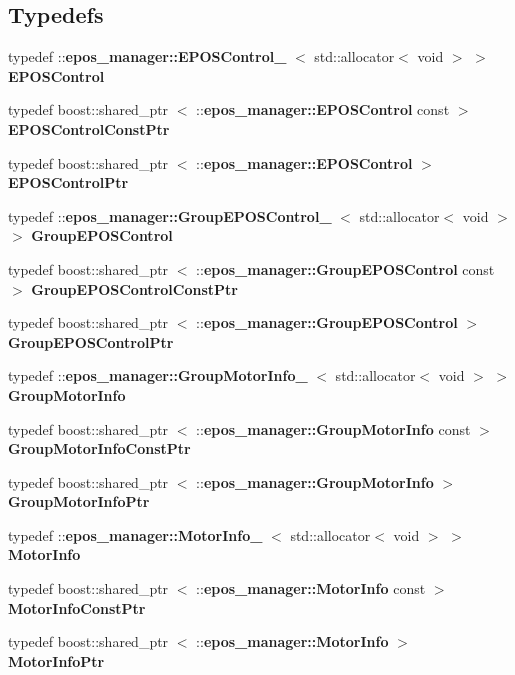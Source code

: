 \subsection*{\-Typedefs}
\begin{DoxyCompactItemize}
\item 
typedef \*
\-::{\bf epos\-\_\-manager\-::\-E\-P\-O\-S\-Control\-\_\-}\*
$<$ std\-::allocator$<$ void $>$ $>$ {\bf \-E\-P\-O\-S\-Control}
\item 
typedef boost\-::shared\-\_\-ptr\*
$<$ \-::{\bf epos\-\_\-manager\-::\-E\-P\-O\-S\-Control} \*
const  $>$ {\bf \-E\-P\-O\-S\-Control\-Const\-Ptr}
\item 
typedef boost\-::shared\-\_\-ptr\*
$<$ \-::{\bf epos\-\_\-manager\-::\-E\-P\-O\-S\-Control} $>$ {\bf \-E\-P\-O\-S\-Control\-Ptr}
\item 
typedef \*
\-::{\bf epos\-\_\-manager\-::\-Group\-E\-P\-O\-S\-Control\-\_\-}\*
$<$ std\-::allocator$<$ void $>$ $>$ {\bf \-Group\-E\-P\-O\-S\-Control}
\item 
typedef boost\-::shared\-\_\-ptr\*
$<$ \-::{\bf epos\-\_\-manager\-::\-Group\-E\-P\-O\-S\-Control} \*
const  $>$ {\bf \-Group\-E\-P\-O\-S\-Control\-Const\-Ptr}
\item 
typedef boost\-::shared\-\_\-ptr\*
$<$ \-::{\bf epos\-\_\-manager\-::\-Group\-E\-P\-O\-S\-Control} $>$ {\bf \-Group\-E\-P\-O\-S\-Control\-Ptr}
\item 
typedef \*
\-::{\bf epos\-\_\-manager\-::\-Group\-Motor\-Info\-\_\-}\*
$<$ std\-::allocator$<$ void $>$ $>$ {\bf \-Group\-Motor\-Info}
\item 
typedef boost\-::shared\-\_\-ptr\*
$<$ \-::{\bf epos\-\_\-manager\-::\-Group\-Motor\-Info} \*
const  $>$ {\bf \-Group\-Motor\-Info\-Const\-Ptr}
\item 
typedef boost\-::shared\-\_\-ptr\*
$<$ \-::{\bf epos\-\_\-manager\-::\-Group\-Motor\-Info} $>$ {\bf \-Group\-Motor\-Info\-Ptr}
\item 
typedef \*
\-::{\bf epos\-\_\-manager\-::\-Motor\-Info\-\_\-}\*
$<$ std\-::allocator$<$ void $>$ $>$ {\bf \-Motor\-Info}
\item 
typedef boost\-::shared\-\_\-ptr\*
$<$ \-::{\bf epos\-\_\-manager\-::\-Motor\-Info} \*
const  $>$ {\bf \-Motor\-Info\-Const\-Ptr}
\item 
typedef boost\-::shared\-\_\-ptr\*
$<$ \-::{\bf epos\-\_\-manager\-::\-Motor\-Info} $>$ {\bf \-Motor\-Info\-Ptr}
\end{DoxyCompactItemize}
